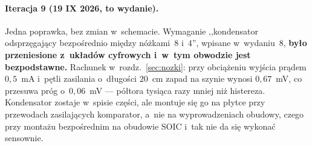 \documentclass[a4paper,11pt]{article}
\begin{document}
\paragraph{Iteracja 9 (19 IX 2026, to wydanie).} Jedna poprawka, bez zmian
w~schemacie. Wymaganie ,,kondensator odsprzęgający bezpośrednio między nóżkami~8
i~4'', wpisane w~wydaniu~8, \textbf{było przeniesione z~układów cyfrowych i~w~tym
obwodzie jest bezpodstawne.} Rachunek w~rozdz.~\ref{sec:nozki}: przy obciążeniu
wyjścia prądem $0{,}5$~mA i~pętli zasilania o~długości $20$~cm zapad na szynie
wynosi $0{,}67$~mV, co przesuwa próg o~$0{,}06$~mV --- półtora tysiąca razy mniej
niż histereza. Kondensator zostaje w~spisie części, ale montuje się go na płytce
przy przewodach zasilających komparator, a~nie na wyprowadzeniach obudowy, czego
przy montażu bezpośrednim na obudowie SOIC i~tak nie da się wykonać sensownie.
\end{document}
